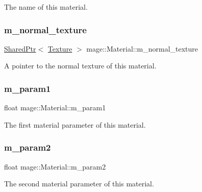 The name of this material. \hypertarget{structmage_1_1_material_a18e56785d5ca3ae5a9b99c64e70622d6}{}\label{structmage_1_1_material_a18e56785d5ca3ae5a9b99c64e70622d6} 
\subsubsection{\texorpdfstring{m\+\_\+normal\+\_\+texture}{m\_normal\_texture}}
{\footnotesize\ttfamily \hyperlink{namespacemage_a1e01ae66713838a7a67d30e44c67703e}{Shared\+Ptr}$<$ \hyperlink{classmage_1_1_texture}{Texture} $>$ mage\+::\+Material\+::m\+\_\+normal\+\_\+texture\hspace{0.3cm}{\ttfamily [private]}}

A pointer to the normal texture of this material. \hypertarget{structmage_1_1_material_a1d715533a43b78bbae02b5e243d59f00}{}\label{structmage_1_1_material_a1d715533a43b78bbae02b5e243d59f00} 
\subsubsection{\texorpdfstring{m\+\_\+param1}{m\_param1}}
{\footnotesize\ttfamily float mage\+::\+Material\+::m\+\_\+param1\hspace{0.3cm}{\ttfamily [private]}}

The first material parameter of this material. \hypertarget{structmage_1_1_material_ac451f95eb5b81b6eaa834d9c038f4471}{}\label{structmage_1_1_material_ac451f95eb5b81b6eaa834d9c038f4471} 
\subsubsection{\texorpdfstring{m\+\_\+param2}{m\_param2}}
{\footnotesize\ttfamily float mage\+::\+Material\+::m\+\_\+param2\hspace{0.3cm}{\ttfamily [private]}}

The second material parameter of this material. \hypertarget{structmage_1_1_material_a725176729546010fa227b73ba3863e29}{}\label{structmage_1_1_material_a725176729546010fa227b73ba3863e29} 
